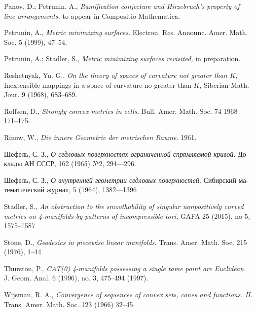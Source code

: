 \begin{thebibliography}{52}
Panov, D.; Petrunin, A.,
\textit{Ramification conjecture and Hirzebruch's property of line arrangements.}
to appear in Compositio Mathematica.

Petrunin, A.,
\textit{Metric minimizing surfaces.}
Electron. Res. Announc. Amer. Math. Soc. 
5 
(1999), 
47--54.


Petrunin, A.; 
Stadler, S., 
\textit{Metric minimizing surfaces revisited,}
in preparation.

Reshetnyak, Yu. G.,
\textit{On the theory of spaces of curvature not greater than $K$},
Inextensible mappings in a space of curvature
no greater than $K$, Siberian Math. Jour. 9 (1968), 683--689.

Rolfsen, D.,
\textit{Strongly convex metrics in cells.}
Bull. Amer. Math. Soc. 74 1968 171–175.

Rinow, W., 
\textit{Die innere Geometrie der metrischen Raume.} 1961.

\begin{otherlanguage}{russian}
Шефель, С. З.,
\textit{О седловых поверхностях ограниченной спрямляемой кривой.}
Доклады АН СССР, 162 (1965) №2, 
294---296.
\end{otherlanguage}

\begin{otherlanguage}{russian}
Шефель, С. З., 
\textit{О внутренней геометрии седловых поверхностей.}
Сибирский математический журнал, 5 (1964), 1382---1396
\end{otherlanguage}

Stadler, S.,
\textit{An obstruction to the smoothability of singular nonpositively curved metrics on 4-manifolds by patterns of incompressible tori,}
GAFA
25 (2015), 
no 5, 
1575--1587

Stone, D.,
\textit{Geodesics in piecewise linear manifolds.}
Trans. Amer. Math. Soc. 
215 
(1976), 
1--44.

 Thurston, P.,
\textit{CAT(0) 4-manifolds possessing a single tame point are Euclidean.} 
J. Geom. Anal. 
6 (1996), 
no. 3, 
475--494 (1997). 

 Wijsman, R. A., 
\textit{Convergence of sequences of convex sets, cones and functions. II.} 
Trans. Amer. Math. Soc. 
123 (1966) 32--45.


\end{thebibliography}
